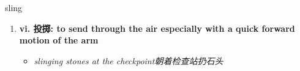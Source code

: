 
\begin{frame}
{\huge sling}
\begin{center}
\begin{enumerate}\Large
  \item \textbf{vi. 投掷: to send through the air especially with a quick forward motion of the arm}
  \begin{itemize}
    \item \em{\Large{slinging stones at the checkpoint朝着检查站扔石头}}
  \end{itemize}
\end{enumerate}
\end{center}
\end{frame}
